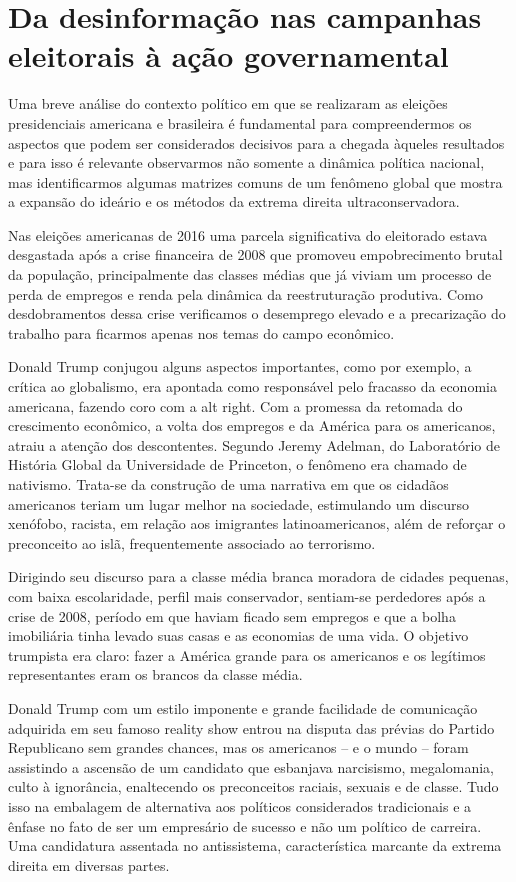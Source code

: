 \section{Da desinformação nas campanhas eleitorais à ação governamental}

Uma breve análise do contexto político em que se realizaram as eleições
presidenciais americana e brasileira é fundamental para compreendermos
os aspectos que podem ser considerados decisivos para a chegada àqueles
resultados e para isso é relevante observarmos não somente a dinâmica
política nacional, mas identificarmos algumas matrizes comuns de um
fenômeno global que mostra a expansão do ideário e os métodos da extrema
direita ultraconservadora.

Nas eleições americanas de 2016 uma parcela significativa do eleitorado
estava desgastada após a crise financeira de 2008 que promoveu
empobrecimento brutal da população, principalmente das classes médias
que já viviam um processo de perda de empregos e renda pela dinâmica da
reestruturação produtiva. Como desdobramentos dessa crise verificamos o
desemprego elevado e a precarização do trabalho para ficarmos apenas nos
temas do campo econômico.

Donald Trump conjugou alguns aspectos importantes, como por exemplo, a
crítica ao globalismo, era apontada como responsável pelo fracasso da
economia americana, fazendo coro com a alt right. Com a promessa da
retomada do crescimento econômico, a volta dos empregos e da América
para os americanos, atraiu a atenção dos descontentes. Segundo Jeremy
Adelman, do Laboratório de História Global da Universidade de Princeton,
o fenômeno era chamado de nativismo. Trata-se da construção de uma
narrativa em que os cidadãos americanos teriam um lugar melhor na
sociedade, estimulando um discurso xenófobo, racista, em relação aos
imigrantes latinoamericanos, além de reforçar o preconceito ao islã,
frequentemente associado ao terrorismo.

Dirigindo seu discurso para a classe média branca moradora de cidades
pequenas, com baixa escolaridade, perfil mais conservador, sentiam-se
perdedores após a crise de 2008, período em que haviam ficado sem
empregos e que a bolha imobiliária tinha levado suas casas e as
economias de uma vida. O objetivo trumpista era claro: fazer a América
grande para os americanos e os legítimos representantes eram os brancos
da classe média.

Donald Trump com um estilo imponente e grande facilidade de comunicação
adquirida em seu famoso reality show entrou na disputa das prévias do
Partido Republicano sem grandes chances, mas os americanos -- e o mundo
-- foram assistindo a ascensão de um candidato que esbanjava narcisismo,
megalomania, culto à ignorância, enaltecendo os preconceitos raciais,
sexuais e de classe. Tudo isso na embalagem de alternativa aos políticos
considerados tradicionais e a ênfase no fato de ser um empresário de
sucesso e não um político de carreira. Uma candidatura assentada no
antissistema, característica marcante da extrema direita em diversas
partes.

